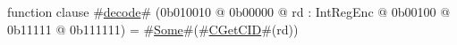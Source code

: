function clause #\hyperref[sailMIPSzdecode]{decode}# (0b010010 @ 0b00000 @ rd : IntRegEnc @    0b00100 @    0b11111 @ 0b111111) = #\hyperref[sailMIPSzSome]{Some}#(#\hyperref[sailMIPSzCGetCID]{CGetCID}#(rd))

